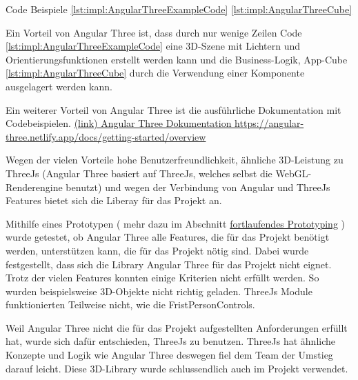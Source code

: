 Code Beispiele \ref{lst:impl:AngularThreeExampleCode} \ref{lst:impl:AngularThreeCube} \cite{AngularThreeDocumentationFirstScene}

Ein Vorteil von Angular Three ist, dass durch nur wenige Zeilen Code \ref{lst:impl:AngularThreeExampleCode} eine 3D-Szene mit Lichtern und Orientierungsfunktionen erstellt werden kann und die Business-Logik, App-Cube \ref{lst:impl:AngularThreeCube} durch die Verwendung einer Komponente ausgelagert werden kann.

Ein weiterer Vorteil von Angular Three ist die ausführliche Dokumentation mit Codebeispielen. \href{https://angular-three.netlify.app/docs/getting-started/overview}{(link) Angular Three Dokumentation https://angular-three.netlify.app/docs/getting-started/overview}

Wegen der vielen Vorteile hohe Benutzerfreundlichkeit, ähnliche 3D-Leistung zu ThreeJs (Angular Three basiert auf ThreeJs, welches selbst die WebGL-Renderengine benutzt) und wegen der Verbindung von Angular und ThreeJs Features bietet sich die Liberay für das Projekt an.

Mithilfe eines Prototypen ( mehr dazu im Abschnitt \hyperref[ch::ongoing-prototyping]{fortlaufendes Prototyping} ) wurde getestet, ob Angular Three alle Features, die für das Projekt benötigt werden, unterstützen kann, die für das Projekt nötig sind. Dabei wurde festgestellt, dass sich die Library Angular Three für das Projekt nicht eignet. Trotz der vielen Features konnten einige Kriterien nicht erfüllt werden. So wurden beispielsweise 3D-Objekte nicht richtig geladen. ThreeJs Module funktionierten Teilweise nicht, wie die FristPersonControls. 

Weil Angular Three nicht die für das Projekt aufgestellten Anforderungen erfüllt hat, wurde sich dafür entschieden, ThreeJs zu benutzen. ThreeJs hat ähnliche Konzepte und Logik wie Angular Three deswegen fiel dem Team der Umstieg darauf leicht. Diese 3D-Library wurde schlussendlich auch im Projekt verwendet.